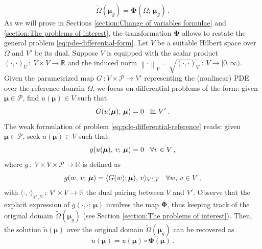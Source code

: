 \documentclass[12pt, a4paper, twoside, openright, notitlepage]{report}
\numberwithin{equation}{chapter}
\theoremstyle{theorem}
\theoremstyle{definition}
\theoremstyle{remark}
\theoremstyle{proposition}
\numberwithin{figure}{chapter}
\newcommand{\norm}[1]{\left\lVert#1\right\rVert}
\newcommand{\wt}[1]{\widetilde{#1}}
\newcommand{\bg}[1]{\boldsymbol{#1}}
\begin{document}
		\begin{equation*}
			\label{eq:parametrized-map}
			\wt{\Omega}(\bg{\mu}_g) = \bg{\Phi}(\Omega; \, \bg{\mu}_g) \, .
		\end{equation*}
		As we will prove in Sections \ref{section:Change of variables formulae} and \ref{section:The problems of interest}, the transformation $\bg{\Phi}$ allows to restate the general problem \eqref{eq:pde-differential-form}. Let $V$ be a suitable Hilbert space over $\Omega$ and $V'$ be its dual. Suppose $V$ is equipped with the scalar product $(\cdot, \cdot)_V ~ : ~ V \times V \rightarrow \mathbb{R}$ and the induced norm $\norm{\cdot}_V = \sqrt{(\cdot, \cdot)_V} ~ : ~ V \rightarrow [0,\infty)$. Given the parametrized map $G ~ : V \times \mathcal{P} \rightarrow V'$ representing the (nonlinear) PDE over the reference domain $\Omega$, we focus on differential problems of the form: given $\bg{\mu} \in \mathcal{P}$, find $u(\bg{\mu}) \in V$ such that
		\begin{equation}
			\label{eq:pde-differential-reference}
			G(u(\bg{\mu}); \, \bg{\mu}) = 0 \hspace*{0.3cm} \text{in $V'$} \, .
		\end{equation}
		The weak formulation of problem \eqref{eq:pde-differential-reference} reads: given $\bg{\mu} \in \mathcal{P}$, seek $u(\bg{\mu}) \in V$ such that
		\begin{equation}
			\label{eq:pde-weak-reference}
			g(u(\bg{\mu}), \, v; \, \bg{\mu}) = 0 \hspace*{0.3cm} \forall v \in V \, ,
		\end{equation}
		where $g ~ : ~ V \times V \times \mathcal{P} \rightarrow \mathbb{R}$ is defined as
		\begin{equation*}
			g(w, \, v; \, \bg{\mu}) = \langle G(w); \bg{\mu}), \, v \rangle_{V',V} \hspace*{0.3cm} \forall w, \, v \in V \, ,
		\end{equation*}
		with $\langle \cdot, \cdot \rangle_{V',V} ~ : ~ V' \times V \rightarrow \mathbb{R}$ the dual pairing between $V$ and $V'$. Observe that the explicit expression of $g(\cdot, \cdot; \, \bg{\mu})$ involves the map $\bg{\Phi}$, thus keeping track of the original domain $\wt{\Omega}(\bg{\mu}_g)$ (see Section \ref{section:The problems of interest}). Then, the solution $\wt{u}(\bg{\mu})$ over the original domain $\wt{\Omega}(\bg{\mu}_g)$ can be recovered as
		\begin{equation*}
			\wt{u}(\bg{\mu}) = u(\bg{\mu}) \circ \bg{\Phi}(\bg{\mu}) \, .
		\end{equation*}
\end{document}

